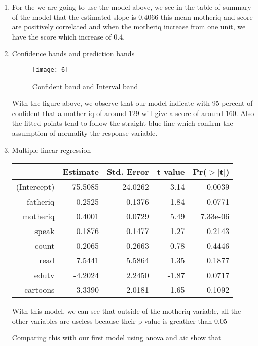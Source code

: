 \documentclass[12pt,a4paper]{article}
\begin{document}
\begin{enumerate}
\item For the we are going to use the model above, we see in the table of summary of the model that the estimated slope is 0.4066 this mean motheriq and score are positively correlated and when the motheriq increase from one unit, we have the score which increase of 0.4.

\item Confidence bands and prediction bands

\begin{figure}[H]
	\centering
	\texttt{[image: 6]}
	\caption{Confident band and Interval band}
\end{figure}
With the figure above, we observe that our model indicate with 95 percent of confident that a mother iq of around 129 will give a score of around 160. Also the fitted points tend to follow the straight blue line which confirm the assumption of normality the response variable.

\item Multiple linear regression
\begin{table}[ht]
	\centering
	\begin{tabular}{rrrrr}
		\hline
		& Estimate & Std. Error & t value & Pr($>$$|$t$|$) \\ 
		\hline
		(Intercept) & 75.5085 & 24.0262 & 3.14 & 0.0039 \\ 
		fatheriq & 0.2525 & 0.1376 & 1.84 & 0.0771 \\ 
		motheriq & 0.4001 & 0.0729 & 5.49 & 7.33e-06  \\ 
		speak & 0.1876 & 0.1477 & 1.27 & 0.2143 \\ 
		count & 0.2065 & 0.2663 & 0.78 & 0.4446 \\ 
		read & 7.5441 & 5.5864 & 1.35 & 0.1877 \\ 
		edutv & -4.2024 & 2.2450 & -1.87 & 0.0717 \\ 
		cartoons & -3.3390 & 2.0181 & -1.65 & 0.1092 \\ 
		\hline
	\end{tabular}
\end{table}

With this model, we can see that outside of the motheriq variable, all the other variables are useless because their p-value is greather than 0.05

Comparing this with our first model using anova and aic show that


\end{enumerate}
\end{document}
